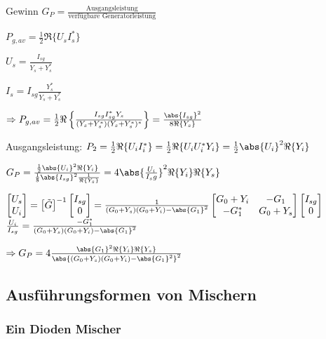 Gewinn $G_P = \frac{\text{Ausgangsleistung}}{\text{verfügbare Generatorleistung}}$


$P_{g,av} = \frac{1}{2} \Re \{U_s I_s^*\}$

$U_s = \frac{I_{sg}}{Y_s + Y_s^*}$

$I_s = I_{sg} \frac{Y_s^*}{Y_s + Y_s^*}$

$\Rightarrow P_{g,av} = \frac{1}{2} \Re \left\{ \frac{I_{sg}I_{sg}^*Y_s}{(Y_s + Y_s^*)(Y_s + Y_s^*)^*}\right\}
= \frac{\abs{I_{sg}}^2}{8\Re \{Y_s\}}$

Ausgangsleistung: $P_2 = \frac{1}{2} \Re \{U_iI_i^*\} = \frac{1}{2} \Re \{U_iU_i^*Y_i\} = \frac{1}{2} \abs{U_i}^2 \Re\{Y_i\}$


$G_P = \frac{\frac{1}{2}\abs{U_i}^2 \Re\{Y_i\}}{\frac{1}{8}\abs{I_{sg}}^2 \frac{1}{\Re \{Y_s\}}}
= 4\abs{\frac{U_i}{I_sg}}^2 \Re\{Y_i\}\Re\{Y_s\}$


$\begin{bmatrix}
    U_s \\ U_i \end{bmatrix}= \begin{bmatrix}
        \tilde{G}
    \end{bmatrix}^{-1} \begin{bmatrix}
        I_{sg} \\ 0
    \end{bmatrix} = \frac{1}{(G_0 + Y_s)(G_0 + Y_i) - \abs{G_1}^2} \begin{bmatrix}
        G_0 + Y_i & -G_1 \\ -G_1^* & G_0 + Y_s
    \end{bmatrix} \begin{bmatrix}
        I_{sg} \\ 0
    \end{bmatrix}
$
$\frac{U_i}{I_{sg}} = \frac{-G_1^*}{(G_0 + Y_s)(G_0 + Y_i) - \abs{G_1}^2}$


$\Rightarrow G_P = 4 \frac{\abs{G_1}^2\Re\{Y_i\}\Re\{Y_s\}}{\abs{(G_0 + Y_s)(G_0 + Y_i) - \abs{G_1}^2}^2}$


\subsection{Ausführungsformen von Mischern}

\subsubsection{Ein Dioden Mischer}

